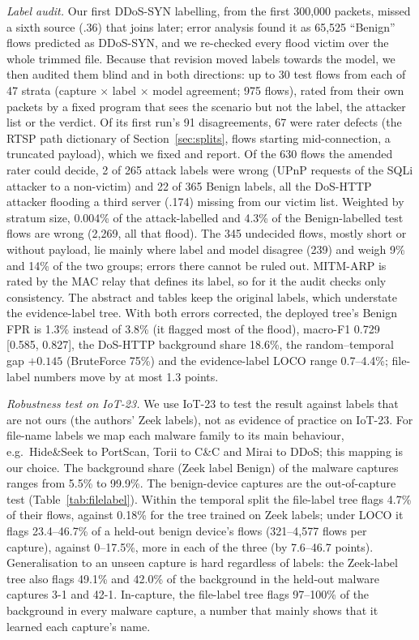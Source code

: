 \emph{Label audit.} Our first DDoS-SYN labelling, from the first 300,000 packets, missed a sixth source (.36) that joins later; error analysis found it as 65,525 ``Benign'' flows predicted as DDoS-SYN, and we re-checked every flood victim over the whole trimmed file. Because that revision moved labels towards the model, we then audited them blind and in both directions: up to 30 test flows from each of 47 strata (capture $\times$ label $\times$ model agreement; 975 flows), rated from their own packets by a fixed program that sees the scenario but not the label, the attacker list or the verdict. Of its first run's 91 disagreements, 67 were rater defects (the RTSP path dictionary of Section~\ref{sec:splits}, flows starting mid-connection, a truncated payload), which we fixed and report. Of the 630 flows the amended rater could decide, 2 of 265 attack labels were wrong (UPnP requests of the SQLi attacker to a non-victim) and 22 of 365 Benign labels, all the DoS-HTTP attacker flooding a third server (.174) missing from our victim list. Weighted by stratum size, 0.004\% of the attack-labelled and 4.3\% of the Benign-labelled test flows are wrong (2,269, all that flood). The 345 undecided flows, mostly short or without payload, lie mainly where label and model disagree (239) and weigh 9\% and 14\% of the two groups; errors there cannot be ruled out. MITM-ARP is rated by the MAC relay that defines its label, so for it the audit checks only consistency. The abstract and tables keep the original labels, which understate the evidence-label tree. With both errors corrected, the deployed tree's Benign FPR is 1.3\% instead of 3.8\% (it flagged most of the flood), macro-F1 0.729 [0.585, 0.827], the DoS-HTTP background share 18.6\%, the random--temporal gap $+0.145$ (BruteForce 75\%) and the evidence-label LOCO range 0.7--4.4\%; file-label numbers move by at most 1.3 points.

\emph{Robustness test on IoT-23.} We use IoT-23 to test the result against labels that are not ours (the authors' Zeek labels), not as evidence of practice on IoT-23. For file-name labels we map each malware family to its main behaviour, e.g.\ Hide\&Seek to PortScan, Torii to C\&C and Mirai to DDoS; this mapping is our choice. The background share (Zeek label Benign) of the malware captures ranges from 5.5\% to 99.9\%. The benign-device captures are the out-of-capture test (Table~\ref{tab:filelabel}). Within the temporal split the file-label tree flags 4.7\% of their flows, against 0.18\% for the tree trained on Zeek labels; under LOCO it flags 23.4--46.7\% of a held-out benign device's flows (321--4,577 flows per capture), against 0--17.5\%, more in each of the three (by 7.6--46.7 points). Generalisation to an unseen capture is hard regardless of labels: the Zeek-label tree also flags 49.1\% and 42.0\% of the background in the held-out malware captures 3-1 and 42-1. In-capture, the file-label tree flags 97--100\% of the background in every malware capture, a number that mainly shows that it learned each capture's name.

